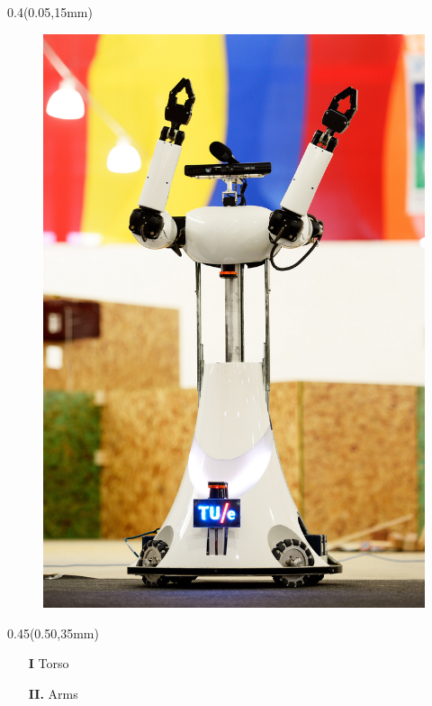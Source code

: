\documentclass[aspectratio=43]{beamer}
\newcommand{\TULeftMargin}{0.05\paperwidth}
\newcommand{\TULeftWidth}{0.4\paperwidth}
\newcommand{\TURightMargin}{0.50\paperwidth}
\newcommand{\TURightWidth}{0.45\paperwidth}
\begin{document}
	\begin{frame}
	
		\begin{textblock*}{\TULeftWidth}(\TULeftMargin,15mm)
			\begin{figure}
				\centering
				\includegraphics[width=0.8\linewidth]{[TechUnitedStyle]/Figures/Arms}
			\end{figure}
		\end{textblock*}
		
	\begin{textblock*}{\TURightWidth}(\TURightMargin,35mm)
		
			\begin{itemize}
				\item[\textcolor{TechUnitedGreen}{\textbf{I}}] Torso
				
				\item[\textcolor{TechUnitedGreen}{\textbf{II.}}] Arms
			\end{itemize}
	\end{textblock*}	
	
	\end{frame}

%	
	
	
\end{document}

